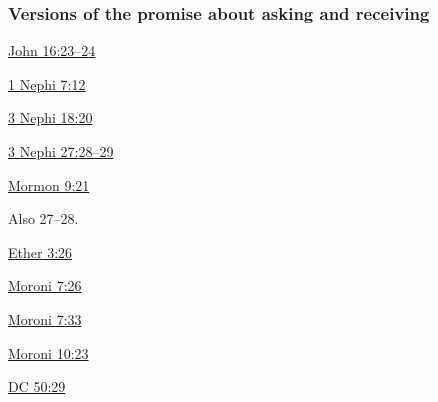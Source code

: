	\subsubsection{Versions of the promise about asking and receiving}
		\label{ASK-receive}
		
		\begin{compactitem}
			\item[{\hyperref[JOHN-16-23]{John 16:23--24}}]
			\item[{\hyperref[1NEPHI-7-12]{1 Nephi 7:12}}]
			\item[{\hyperref[3NEPHI-18-20]{3 Nephi 18:20}}]
			\item[{\hyperref[3NEPHI-27-28]{3 Nephi 27:28--29}}]
			\item[{\hyperref[MORMON-9-21]{Mormon 9:21}}] \phantom{.}
				\begin{compactitem}
					\item Also 27--28.
				\end{compactitem}
			\item[{\hyperref[ETHER-3-26]{Ether 3:26}}]
			\item[{\hyperref[MORONI-7-26]{Moroni 7:26}}]
			\item[{\hyperref[MORONI-7-33]{Moroni 7:33}}]
			\item[{\hyperref[MORONI-10-23]{Moroni 10:23}}]
			\item[{\hyperref[DC50-29]{DC 50:29}}]
		\end{compactitem}